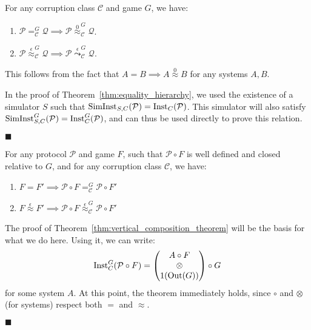 \begin{theorem}
  For any corruption class $\mathcal{C}$ and game $G$, we have:
\begin{enumerate}
\item $\mathcal{P} =^G_{\mathcal{C}} \mathcal{Q} \implies \mathcal{P} \overset{0}{\approx}^G_\mathcal{C} \mathcal{Q}$.
\item $\mathcal{P} \overset{\epsilon}{\approx}^G_{\mathcal{C}} \mathcal{Q} \implies \mathcal{P} \overset{\epsilon}{\leadsto}^G_\mathcal{C} \mathcal{Q}$.
\end{enumerate}

 This follows from the fact that $A = B \implies A \overset{0}{\approx} B$
for any systems $A, B$.

 In the proof of Theorem~\ref{thm:equality_hierarchy},
we used the existence of a simulator $S$ such that $\text{SimInst}_{S, C}(\mathcal{P}) = \text{Inst}_C(\mathcal{P})$.
This simulator will also satisfy $\text{SimInst}^G_{S, C}(\mathcal{P}) = \text{Inst}^G_C(\mathcal{P})$,
and can thus be used directly to prove this relation.

$\blacksquare$
\end{theorem}

\begin{theorem}
  For any protocol $\mathcal{P}$ and game $F$, such that $\mathcal{P} \circ F$
  is well defined and closed relative to $G$, and for any corruption class $\mathcal{C}$, we have:
  \begin{enumerate}
    \item $F = F' \implies \mathcal{P} \circ F =^G_{\mathcal{C}} \mathcal{P} \circ F'$
    \item $F \overset{\epsilon}{\approx} F' \implies \mathcal{P} \circ F \overset{\epsilon}{\approx}^G_{\mathcal{C}} \mathcal{P} \circ F'$
  \end{enumerate}

   The proof of Theorem~\ref{thm:vertical_composition_theorem} will be the basis
  for what we do here.
  Using it, we can write:
  $$
  \text{Inst}^G_C(\mathcal{P} \circ F) =
  \begin{pmatrix}
    A \circ F\cr
    \otimes\cr
    1(\text{Out}(G))
  \end{pmatrix}
  \circ G
  $$
  for some system $A$.
  At this point, the theorem immediately holds, since $\circ$ and $\otimes$ (for systems)
  respect both $=$ and $\approx$.

  $\blacksquare$
\end{theorem}

